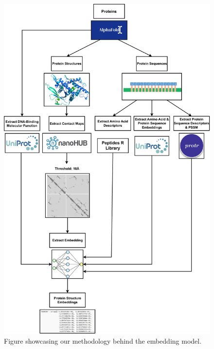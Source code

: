 \begin{figure}[!h]
    \centering
    \includegraphics[width=0.78\linewidth]{images/Embeddings_Methodology.pdf}    
    \caption{Figure showcasing our methodology behind the embedding model.}
    \label{fig:Embeddings_Methodology} 
\end{figure}


